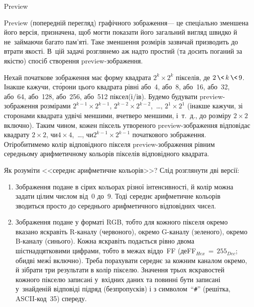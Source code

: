 {

\begin{problemAllDefault}{Preview}

Preview (попередній перегляд) графічного зображення\nolinebreak[3] --- це спеціально зменшена його версія, призначена, щоб могти показати його загальний вигляд швидко й не~займаючи багато пам'яті. Таке зменшення розмірів зазвичай призводить до втрати якості. В~цій задачі розглянемо аж надто простий (та досить поганий за якістю) спосіб створення preview-зображення.

Нехай початкове зображення має форму квадрата $2^k{\times}2^k$ пікселів, де ${2\,{\<}\,k\,{\<}\,9}$. Інакше кажучи, ст\'{о}рони цього квадрата рівні 
або~4, 
або~8,
або~16,
або~32,
або~64,
або~128,
або~256,
або~512 піксел(і/ів).
Будемо будувати preview-зображення розмірами 
$2^{k-1}{\times}2^{k-1}$,
$2^{k-2}{\times}2^{k-2}$,~\dots,
$2^{1}{\times}2^{1}$ (інакше кажучи, зі сторонами квадрата удвічі меншими, вчетверо меншими, і~т.~д., до розміру $2{\times}2$ включно). Таким чином, кожен піксель утвореного preview-зображення відповідає квадрату 
$2{\times}2$,
чи\nolinebreak[3] $4{\times}4$,~\dots,
чи\nolinebreak[3] $2^{k-1}{\times}2^{k-1}$
початкового зображення.
От\nolinebreak[3] і\nolinebreak[3] робитимемо колір відповідного пікселя preview-зображення рівним середньому арифметичному кольорів пікселів відповідного квадрата.

Як розуміти <<середнє арифметичне кольорів>>? 
Слід
розглянути дві версії:
\begin{enumerate}
\item
Зображення подане в сірих кольорах різної інтенсивності, й колір можна задати цілим числом від~0 до~9. Тоді середнє арифметичне кольорів зводиться просто до середнього арифметичного відповідних чисел.
\item
Зображення подане у форматі RGB, тобто для кожного пікселя окремо вказано яскравіть 
\mbox{R-}\nolinebreak[3]каналу (червоного), 
окремо \mbox{G-}\nolinebreak[3]каналу (зеленого), 
окремо \mbox{B-}\nolinebreak[3]каналу (синього).
Кожна яскравіть подається рівно двома шістнадцятковими цифрами, тобто в межах від\nolinebreak[2] до~FF (де\nolinebreak[2] FF$_{Hex}\,{=}\,255_{Dec}$; обидві меж\'{і} включно). Треба порахувати середнє за кожним каналом окремо, й зібрати три результати в колір пікселю. Значення трьох 
яскравостей 
кожного пікселю записані у~вхідних даних та повинні бути записані у~знайденій відповіді підряд (без\nolinebreak[3] пропусків) і з символом~``\verb"#"'' (решітка, ASCII-код~35) спереду.
\end{enumerate}


\end{problemAllDefault}}
